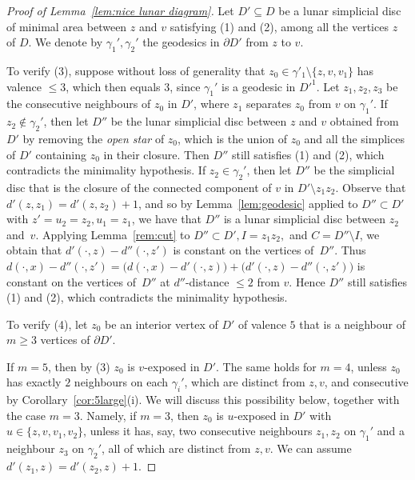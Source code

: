 \documentclass[a4paper,12pt,leqno]{amsart}
\theoremstyle{definition}
\begin{document}
\begin{proof}[Proof of Lemma~\ref{lem:nice lunar diagram}]
Let $D'\subseteq D$ be a lunar simplicial disc of minimal area between $z$ and $v$ satisfying (1) and (2), among all the vertices $z$ of $D$. We denote by $\gamma_1', \gamma_2'$ the geodesics in $\partial D'$ from $z$ to $v$.

To verify (3), suppose without loss of generality that $z_0\in \gamma'_1\setminus \{z,v,v_1\}$ has valence $\leq 3$, which then equals $3$, since $\gamma_1'$ is a geodesic in $D'^1$. Let $z_1,z_2,z_3$ be the consecutive neighbours of $z_0$ in $D'$, where $z_1$ separates $z_0$ from $v$ on $\gamma_1'$.
If $z_2\notin \gamma_2'$, then let $D''$ be the lunar simplicial disc between $z$ and $v$ obtained from $D'$ by removing the \emph{open star} of $z_0$, which is the union of $z_0$ and all the simplices of $D'$ containing $z_0$ in their closure. Then $D''$ still satisfies (1) and (2), which contradicts the minimality hypothesis. If $z_2\in \gamma_2'$, then let $D''$ be the simplicial disc that is the closure of the connected component of $v$ in $D'\setminus z_1z_2$. Observe that $d'(z,z_1)=d'(z,z_2)+1$, and so by Lemma~\ref{lem:geodesic} applied to $D''\subset D'$ with $z'=u_2=z_2,u_1=z_1$, we have that $D''$ is a lunar simplicial disc between $z_2$ and~$v$. Applying Lemma~\ref{rem:cut} to $D''\subset D', I=z_1z_2,$ and $C=D''\setminus I$, we obtain that $d'(\cdot,z)-d''(\cdot,z')$ is constant on the vertices of~$D''$. Thus $d(\cdot,x)-d''(\cdot,z')=\big(d(\cdot,x)-d'(\cdot,z)\big)+\big(d'(\cdot,z)-d''(\cdot,z')\big)$ is constant on the vertices of~$D''$ at $d''$-distance $\leq 2$ from $v$. Hence $D''$ still satisfies (1) and (2), which contradicts the minimality hypothesis.

To verify (4), let $z_0$ be an interior vertex of $D'$ of valence $5$ that is a neighbour of $m\geq 3$ vertices of $\partial D'$. 

If $m=5$, then by (3) $z_0$ is $v$-exposed in $D'$. The same holds for $m=4$, unless $z_0$ has exactly $2$ neighbours 
on each $\gamma_i'$, which are distinct from $z,v$, and consecutive by Corollary~\ref{cor:5large}(i). We will discuss this possibility below, together with the case $m=3$. Namely, if $m=3$, then $z_0$ is $u$-exposed in $D'$ with $u\in \{z,v,v_1,v_2\}$, unless it has, say, two consecutive neighbours $z_1,z_2$ on $\gamma_1'$ and a neighbour $z_3$ on $\gamma_2'$, all of which are distinct from $z,v$. We can assume $d'(z_1,z) = d'(z_2,z)+1$. 


\end{proof}
\end{document}
